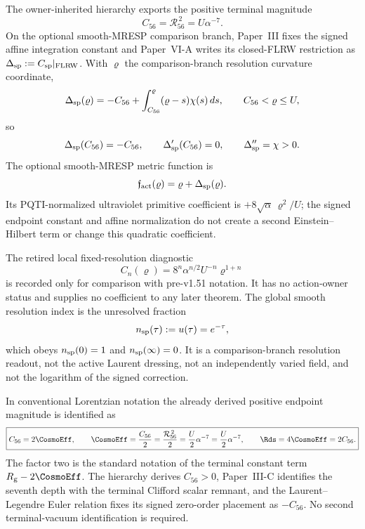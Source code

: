 \documentclass[12pt,a4paper]{article}
\begin{document}
The owner-inherited hierarchy exports the positive terminal magnitude
\begin{equation}
\label{p8:eq:p3-smooth-resolution-endpoint}
 C_{56}=\mathcal R_{56}^{\,2}
 =U\alpha^{-7}.
\end{equation}
On the optional smooth-MRESP comparison branch, Paper~III fixes the signed
affine integration constant and Paper~VI-A writes its closed-FLRW restriction
as \(\Delta_{\rm sp}:=C_{\rm sp}|_{\rm FLRW}\).  With \(\varrho\) the
comparison-branch resolution curvature coordinate,
\begin{equation}
\label{p8:eq:signed-spectral-correction}
 \Delta_{\rm sp}(\varrho)
 =-C_{56}
  +\int_{C_{56}}^{\varrho}(\varrho-s)\chi(s)\,ds,
 \qquad C_{56}<\varrho\le U,
\end{equation}
so
\begin{equation}
 \Delta_{\rm sp}(C_{56})=-C_{56},
 \qquad
 \Delta_{\rm sp}'(C_{56})=0,
 \qquad
 \Delta_{\rm sp}''=\chi>0.
\end{equation}
The optional smooth-MRESP metric function is
\begin{equation}
 \mathfrak f_{\rm act}(\varrho)=\varrho+\Delta_{\rm sp}(\varrho).
\end{equation}
Its PQTI-normalized ultraviolet primitive coefficient is
\( +8\sqrt\alpha\,\varrho^2/U\); the signed endpoint constant and affine
normalization do not create a second Einstein--Hilbert term or change this
quadratic coefficient.

The retired local fixed-resolution diagnostic
\begin{equation}
\label{p8:eq:local-fixed-resolution-check}
 C_n(\varrho)=8^n\alpha^{n/2}U^{-n}\varrho^{1+n}
\end{equation}
is recorded only for comparison with pre-v1.51 notation.  It has no
action-owner status and supplies no coefficient to any later theorem.  The
global smooth resolution index is the unresolved fraction
\begin{equation}
\label{p8:eq:nsp-implicit}
 n_{\rm sp}(\tau):=u(\tau)=e^{-\tau},
\end{equation}
which obeys \(n_{\rm sp}(0)=1\) and \(n_{\rm sp}(\infty)=0\).  It is a
comparison-branch resolution readout, not the active Laurent dressing, not an
independently varied field, and not the logarithm of the signed correction.

In conventional Lorentzian \LCDM notation the already derived positive
endpoint magnitude is identified as
\begin{equation}
\label{p8:eq:LambdaEff-R56-readout}
 \boxed{
 C_{56}=2\CosmoEff,
 \qquad
 \CosmoEff=\frac{C_{56}}2
 =\frac{\mathcal R_{56}^{\,2}}2
 =\frac{U}{2}\alpha^{-7}
 =\frac{U}{2}\alpha^{-7},
 \qquad
 \Rds=4\CosmoEff=2C_{56}.}
\end{equation}
The factor two is the standard notation of the terminal constant term
\(R_{\rm g}-2\CosmoEff\).  The hierarchy derives \(C_{56}>0\), Paper~III-C
identifies the seventh depth with the terminal Clifford scalar remnant, and
the Laurent--Legendre Euler relation fixes its signed zero-order placement as
\(-C_{56}\).  No second terminal-vacuum identification is required.
\end{document}
